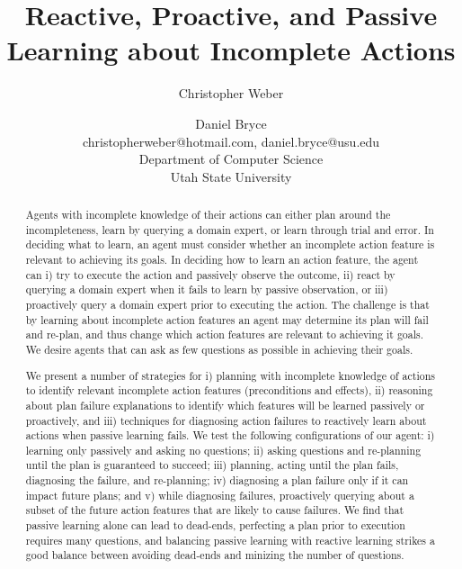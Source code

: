 \documentclass[letterpaper]{article}
\title{Reactive, Proactive, and Passive Learning about Incomplete Actions}
\author{Christopher Weber \and Daniel Bryce\\
christopherweber@hotmail.com, daniel.bryce@usu.edu\\
Department of Computer Science\\
Utah State University}
\begin{document}
\maketitle

\begin{abstract}
Agents with incomplete knowledge of their actions can either plan around the
incompleteness, learn by querying a domain expert, or learn through
trial and error.  In deciding what to learn, an agent must consider whether an
incomplete action feature is relevant to achieving its goals.  In deciding how
to learn an action feature, the agent can i) try to execute the action and
passively observe the outcome, ii) react by querying a domain expert when it
fails to learn by passive observation, or iii) proactively query a domain expert
prior to executing the action.  The challenge is that by learning about
incomplete action features an agent may determine its plan will fail and
re-plan, and thus change which action features are relevant to achieving it
goals.  We desire agents that can ask as few questions as
possible in achieving their goals.

We present a number of strategies for i) planning with incomplete knowledge of
actions to identify relevant incomplete action features (preconditions and
effects), ii) reasoning about plan failure explanations to identify which
features will be learned passively or proactively, and iii) techniques for
diagnosing action failures to reactively learn about actions when passive
learning fails.  We test the following configurations of our agent: i) learning
only passively and asking no questions; ii) asking questions and re-planning
until the plan is guaranteed to succeed; iii) planning, acting until the plan
fails, diagnosing the failure, and re-planning; iv) diagnosing a plan failure
only if it can impact future plans; and v) while diagnosing failures,
proactively querying about a subset of the future action features that are likely to cause failures. 
We find that passive learning alone can lead to dead-ends, perfecting a plan
prior to execution requires many questions, and balancing passive learning with
reactive learning strikes a good balance between avoiding dead-ends and
minizing the number of questions.



\end{abstract}
\end{document}
